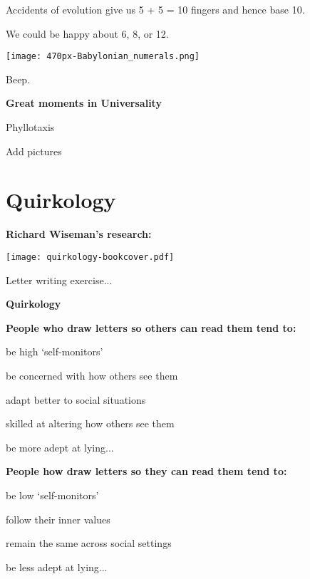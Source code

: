     
     
      Accidents of evolution give us 5 + 5 = 10 fingers
      and hence base 10.
    
      We could be happy about 6, 8, or 12.
    
    


  


      
    \texttt{[image: 470px-Babylonian\_numerals.png]}
    
    
    
      Beep.
    
  
  \textbf{Great moments in Universality}

  Phyllotaxis

  Add pictures


\section{Quirkology}

  \textbf{Richard Wiseman's research:}
  
      
    \texttt{[image: quirkology-bookcover.pdf]}\\
    
    
     
     
      Letter writing exercise...
    
    

  \textbf{Quirkology}

  \textbf{People who draw letters so others can read them tend to:}
    
     
      be high `self-monitors'
     
      be concerned with how others see them
     
      adapt better to social situations
     
      skilled at altering how others see them
     
      be more adept at lying...
        
  

  \textbf{People how draw letters so they can read them tend to:}
    
    
      be low `self-monitors'
    
      follow their inner values
    
      remain the same across social settings
    
      be less adept at lying...
    
